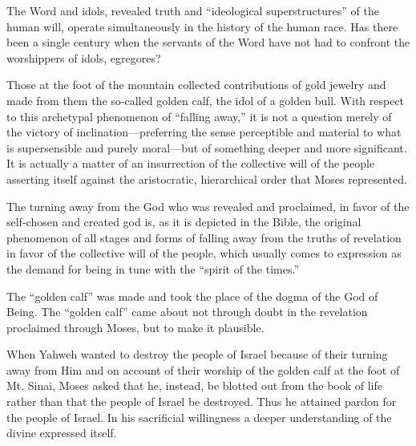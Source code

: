 \begin{quotex}
The Word and idols, revealed truth and ``ideological superstructures'' of the human will, operate simultaneously in the history of the human race. Has there been a single century when the servants of the Word have not had to confront the worshippers of idols, egregores? 

\end{quotex}

Those at the foot of the mountain collected contributions of gold jewelry and made from them the so-called golden calf, the idol of a golden bull. With respect to this archetypal phenomenon of ``falling away,'' it is not a question merely of the victory of inclination—preferring the sense perceptible and material to what is supersensible and purely moral—but of something deeper and more significant. It is actually a matter of an insurrection of the collective will of the people asserting itself against the aristocratic, hierarchical order that Moses represented.

The turning away from the God who was revealed and proclaimed, in favor of the self-chosen and created god is, as it is depicted in the Bible, the original phenomenon of all stages and forms of falling away from the truths of revelation in favor of the collective will of the people, which usually comes to expression as the demand for being in tune with the ``spirit of the times.''

The ``golden calf'' was made and took the place of the dogma of the God of Being. The ``golden calf'' came about not through doubt in the revelation proclaimed through Moses, but to make it plausible.

\begin{quotex}
When Yahweh wanted to destroy the people of Israel because of their turning away from Him and on account of their worship of the golden calf at the foot of Mt. Sinai, Moses asked that he, instead, be blotted out from the book of life rather than that the people of Israel be destroyed. Thus he attained pardon for the people of Israel. In his sacrificial willingness a deeper understanding of the divine expressed itself. 

\end{quotex}

